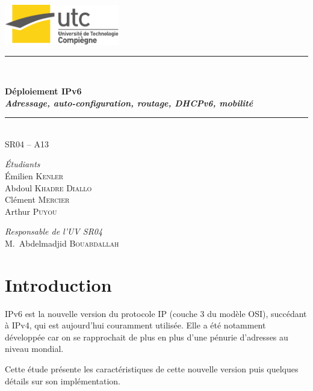 \documentclass[a4paper,11pt,final]{article}
\newcommand{\reporttitle}{Déploiement IPv6 \\ \emph{Adressage, auto-configuration, routage, DHCPv6, mobilité}}     %
\newcommand{\reportauthor}{Émilien \textsc{Kenler}\\ Abdoul \textsc{Khadre Diallo} \\ Clément \textsc{Mercier}\\ Arthur \textsc{Puyou}} %
\newcommand{\HRule}{\rule{\linewidth}{0.5mm}}
\begin{document}
\begin{center}


\includegraphics [width=50mm]{logo-utc.pdf} \\[3cm]

\HRule \\[0.2cm]
\begin{spacing}{1.4}
{\huge \bfseries \reporttitle}\\[0.2cm]
\end{spacing}
\HRule \\[0.5cm]
\textsc{\Large SR04 -- A13}\\[2.0cm]

\begin{minipage}[t]{0.3\textwidth}
  \begin{flushleft} \large
    \emph{Étudiants} \\
    \reportauthor
  \end{flushleft}
\end{minipage}
\begin{minipage}[t]{0.6\textwidth}
  \begin{flushright} \large
    \emph{Responsable de l'UV SR04} \\
    M.~Abdelmadjid \textsc{Bouabdallah} \\
  \end{flushright}
\end{minipage}

\vfill

\end{center}
  \cleardoublepage %
  \tableofcontents %
  \sloppy          %
  \cleardoublepage
  \section{Introduction}
  IPv6 est la nouvelle version du protocole IP (couche 3 du modèle OSI), succédant à IPv4, qui est aujourd'hui couramment utilisée. Elle a été notamment développée car on se rapprochait de plus en plus d’une pénurie d’adresses au niveau mondial.
  
  Cette étude présente les caractéristiques de cette nouvelle version puis quelques détails sur son implémentation.
  
\end{document}
